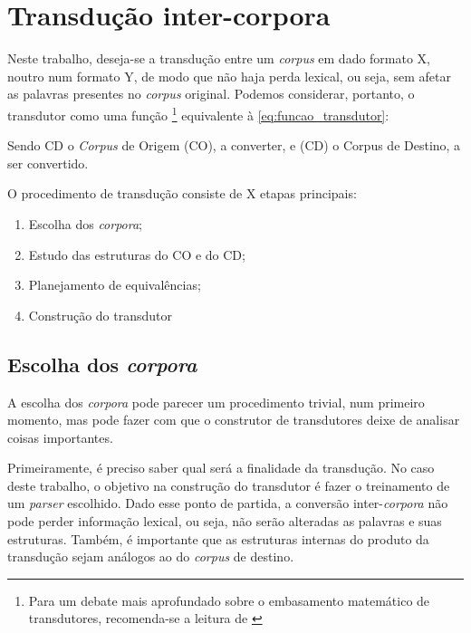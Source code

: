 \section{Transdução inter-corpora}
\label{sec:treino_metodologia}

Neste trabalho, deseja-se a transdução entre um \textit{corpus} em dado formato X, noutro num formato Y, de modo que não haja perda lexical, ou seja, sem afetar as palavras presentes no \textit{corpus} original. Podemos considerar, portanto, o transdutor como uma função
\footnote{Para um debate mais aprofundado sobre o embasamento matemático de transdutores, recomenda-se a leitura de \cite{weightedTransducersMohri}}
equivalente à \ref{eq:funcao_transdutor}:
\begin{center}
    
\end{center}

Sendo CD o \textit{Corpus} de Origem (CO), a converter, e (CD) o Corpus de Destino, a ser convertido.

O procedimento de transdução consiste de X etapas principais: 
\begin{enumerate}
    \item Escolha dos \textit{corpora}; 
    \item Estudo das estruturas do CO e do CD;
    \item Planejamento de equivalências;
    \item Construção do transdutor
\end{enumerate}


\subsection{Escolha dos \textit{corpora}}
\label{subsec:escolha_corpora}

A escolha dos \textit{corpora} pode parecer um procedimento trivial, num primeiro momento, mas pode fazer com que o construtor de transdutores deixe de analisar coisas importantes. 

Primeiramente, é preciso saber qual será a finalidade da transdução. No caso deste trabalho, o objetivo na construção do transdutor é fazer o treinamento de um \textit{parser} escolhido. Dado esse ponto de partida, a conversão inter-\textit{corpora} não pode perder informação lexical, ou seja, não serão alteradas as palavras e suas estruturas. Também, é importante que as estruturas internas do produto da transdução sejam análogos ao do \textit{corpus} de destino.

